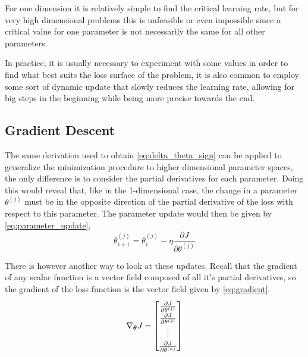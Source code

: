 For one dimension it is relatively simple to find the critical learning rate, but for very high dimensional problems this is unfeasible or even impossible since a critical value for one parameter is not necessarily the same for all other parameters.

In practice, it is usually necessary to experiment with some values in order to find what best suits the loss surface of the problem, it is also common to employ some sort of dynamic update that slowly reduces the learning rate, allowing for big steps in the beginning while being more precise towards the end.


\subsection{Gradient Descent} \label{sub:gradient_descent}
The same derivation used to obtain \autoref{eq:delta_theta_sign} can be applied to generalize the minimization procedure to higher dimensional parameter spaces, the only difference is to consider the partial derivatives for each parameter. Doing this would reveal that, like in the 1-dimensional case, the change in a parameter $\theta^{(j)}$ must be in the opposite direction of the partial derivative of the loss with respect to this parameter. The parameter update would then be given by \autoref{eq:parameter_update}.
\begin{equation} \label{eq:parameter_update}
    \theta_{i+1}^{(j)} = \theta_{i}^{(j)} - \eta \frac{\partial J}{\partial \theta^{(j)}}
\end{equation}

There is however another way to look at these updates. Recall that the gradient of any scalar function is a vector field composed of all it's partial derivatives, so the gradient of the loss function is the vector field given by \autoref{eq:gradient}.
\begin{equation} \label{eq:gradient}
    \renewcommand{\arraystretch}{1.2}
    \nabla_{\bm{\theta}} J = \begin{bmatrix}
        \frac{\partial J}{\partial\theta^{(1)}} \\
        \frac{\partial J}{\partial\theta^{(2)}} \\
        \vdots \\
        \frac{\partial J}{\partial\theta^{(n)}}
    \end{bmatrix}
\end{equation}

